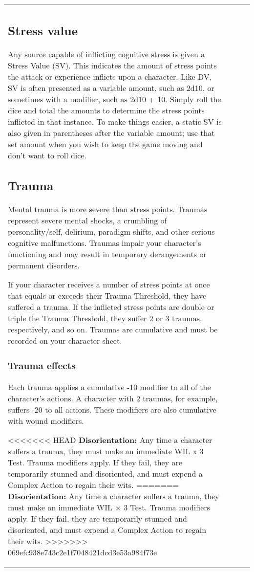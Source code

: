 \begin{table}
\begin{tabular}{|p{8cm}|r|r|r|}
\subsection{Stress value} \label{sec:stress-value} 

Any source capable of inflicting cognitive stress is given a Stress Value (SV). This indicates the amount of stress points the attack or experience inflicts upon a character. Like DV, SV is often presented as a variable amount, such as 2d10, or sometimes with a modifier, such as 2d10 + 10. Simply roll the dice and total the amounts to determine the stress points inflicted in that instance. To make things easier, a static SV is also given in parentheses after the variable amount; use that set amount when you wish to keep the game moving and don’t want to roll dice. 



\subsection{Trauma} \label{sec:trauma} 

Mental trauma is more severe than stress points. Traumas represent severe mental shocks, a crumbling of personality/self, delirium, paradigm shifts, and other serious cognitive malfunctions. Traumas impair your character’s functioning and may result in temporary derangements or permanent disorders. 

If your character receives a number of stress points at once that equals or exceeds their Trauma Threshold, they have suffered a trauma. If the inflicted stress points are double or triple the Trauma Threshold, they suffer 2 or 3 traumas, respectively, and so on. Traumas are cumulative and must be recorded on your character sheet. 

\subsubsection{Trauma effects} 

Each trauma applies a cumulative -10 modifier to all of the character’s actions. A character with 2 traumas, for example, suffers -20 to all actions. These modifiers are also cumulative with wound modifiers. 

<<<<<<< HEAD \textbf{Disorientation:} Any time a character suffers a trauma, they must make an immediate WIL x 3 Test. Trauma modifiers apply. If they fail, they are temporarily stunned and disoriented, and must expend a Complex Action to regain their wits. ======= \textbf{Disorientation:} Any time a character suffers a trauma, they must make an immediate WIL $\times$ 3 Test. Trauma modifiers apply. If they fail, they are temporarily stunned and disoriented, and must expend a Complex Action to regain their wits. >>>>>>> 069efc938e743c2e1f7048421dcd3e53a984f73e 


\end{tabular}
\end{table}
